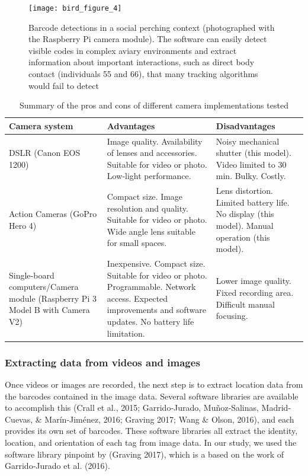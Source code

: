 \documentclass[11pt,a4paper,oneside]{article}
\begin{document}
\begin{figure}
    \centering
    \texttt{[image: bird\_figure\_4]}
    \caption{Barcode detections in a social perching context (photographed with the Raspberry Pi camera module). The software can easily detect visible codes in complex aviary environments and extract information about important interactions, such as direct body contact (individuals 55 and 66), that many tracking algorithms would fail to detect
}
    \label{fig:bird_figure_4}
\end{figure}
\begin{table}
\caption{Summary of the pros and cons of different camera implementations tested}
    \begin{tabular}{| m{} | m{} | m{} |}
         \textbf{Camera system} & \textbf{Advantages} & \textbf{Disadvantages} \\ \hline
         DSLR (Canon EOS 1200)	& Image quality. Availability of lenses and accessories. Suitable for video or photo. Low‐light performance.	& Noisy mechanical shutter (this model). Video limited to 30 min. Bulky. Costly. \\ \hline
         Action Cameras (GoPro Hero 4)	& Compact size. Image resolution and quality. Suitable for video or photo. Wide angle lens suitable for small spaces.	& Lens distortion. Limited battery life. No display (this model). Manual operation (this model). \\ \hline
         Single‐board computers/Camera module (Raspberry Pi 3 Model B with Camera V2)	&
         Inexpensive. Compact size. Suitable for video or photo. Programmable. Network access. Expected improvements and software updates. No battery life limitation.	& Lower image quality. Fixed recording area. Difficult manual focusing.
    \end{tabular}
\label{table:bird_table}
\end{table}

\subsubsection{Extracting data from videos and images}
Once videos or images are recorded, the next step is to extract location data from the barcodes contained in the image data. Several software libraries are available to accomplish this (Crall et al., 2015; Garrido‐Jurado, Muñoz‐Salinas, Madrid‐Cuevas, & Marín‐Jiménez, 2016; Graving 2017; Wang & Olson, 2016), and each provides its own set of barcodes. These software libraries all extract the identity, location, and orientation of each tag from image data. In our study, we used the software library pinpoint by (Graving 2017), which is a based on the work of Garrido‐Jurado et al. (2016).
\end{document}
